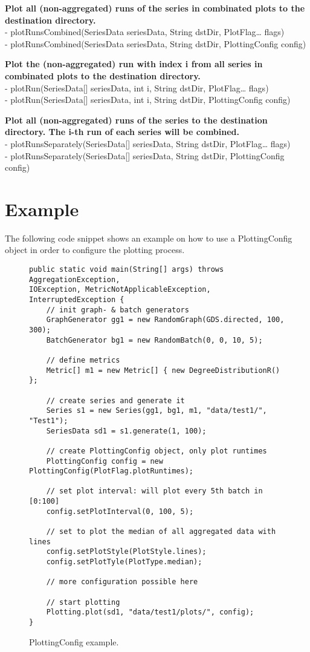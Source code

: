 \textbf{Plot all (non-aggregated) runs of the series in combinated plots to the destination directory.}\\
- plotRunsCombined(SeriesData seriesData, String dstDir, PlotFlag… flags)\\
- plotRunsCombined(SeriesData seriesData, String dstDir, PlottingConfig config)

\textbf{Plot the (non-aggregated) run with index i from all series in combinated plots to the destination directory.}\\
- plotRun(SeriesData[] seriesData, int i, String dstDir, PlotFlag… flags)\\
- plotRun(SeriesData[] seriesData, int i, String dstDir, PlottingConfig config)

\textbf{Plot all (non-aggregated) runs of the series to the destination directory. The i-th run of each series will be combined.}\\
- plotRunsSeparately(SeriesData[] seriesData, String dstDir, PlotFlag… flags)\\
- plotRunsSeparately(SeriesData[] seriesData, String dstDir, PlottingConfig config)

\section{Example}
The following code snippet shows an example on how to use a PlottingConfig object in order to configure the plotting process.

\begin{figure} [bh]
\begin{lstlisting}
public static void main(String[] args) throws AggregationException,
IOException, MetricNotApplicableException, InterruptedException {
	// init graph- & batch generators
	GraphGenerator gg1 = new RandomGraph(GDS.directed, 100, 300);
	BatchGenerator bg1 = new RandomBatch(0, 0, 10, 5);

	// define metrics
	Metric[] m1 = new Metric[] { new DegreeDistributionR() };

	// create series and generate it
	Series s1 = new Series(gg1, bg1, m1, "data/test1/", "Test1");
	SeriesData sd1 = s1.generate(1, 100);

	// create PlottingConfig object, only plot runtimes
	PlottingConfig config = new PlottingConfig(PlotFlag.plotRuntimes);

	// set plot interval: will plot every 5th batch in [0:100]
	config.setPlotInterval(0, 100, 5);
	
	// set to plot the median of all aggregated data with lines
	config.setPlotStyle(PlotStyle.lines);
	config.setPlotTyle(PlotType.median);
	
 	// more configuration possible here
 	
	// start plotting
	Plotting.plot(sd1, "data/test1/plots/", config);
}
\end{lstlisting}
\caption{PlottingConfig example.}
\label{code:example}
\end{figure}